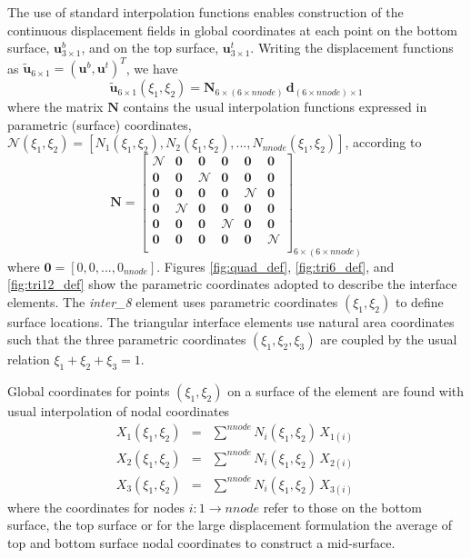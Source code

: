 \documentclass[11pt]{report}
\numberwithin{equation}{section}
\newcommand{\bmf } {\boldsymbol }  %
\newcommand{\ti}{\emph}
\begin{document}
The use of standard interpolation functions 
enables construction of the continuous displacement 
fields in global coordinates at each point on the bottom surface,
$\bmf{u}^b_{3 \times 1}$, and on the top surface, $\bmf{u}^t_{3 \times 1}$.
%
Writing the displacement functions as 
$\bmf{\tilde u}_{6 \times 1}=\left ( \bmf{u}^b,\bmf{u}^t \right )^T$, we have 
%
\begin{equation}
\bmf{\tilde u}_{6 \times 1} ( \xi_1, \xi_2)= \bmf{N}_{6 \times \left ( 6 \times nnode \right )}
\,\bmf{d}_{\left ( 6 \times nnode \right ) \times 1 }
\end{equation}
%
\noindent where the matrix $\bmf{N}$ contains the usual interpolation 
functions expressed in parametric (surface) coordinates, 
$\bmf{\mathcal{N}}\left( \xi_1, \xi_2 \right ) =
 \left[ N_1\left( \xi_1, \xi_2 \right ), N_2\left( \xi_1, \xi_2 \right ), ...,
 N_{nnode}\left( \xi_1, \xi_2 \right )\right ]$, according to
%
\begin{equation}
\bmf{N}= \left [
\begin{matrix}
\bmf{\mathcal{N}} & \bmf{0} & \bmf{0} & \bmf{0} & \bmf{0} & \bmf{0} \\ 
\bmf{0} & \bmf{0} & \bmf{\mathcal{N}}  & \bmf{0} & \bmf{0} & \bmf{0} \\ 
\bmf{0} & \bmf{0} & \bmf{0} & \bmf{0} &\bmf{\mathcal{N}}  & \bmf{0} \\ 
\bmf{0} & \bmf{\mathcal{N}} & \bmf{0} & \bmf{0}& \bmf{0}& \bmf{0} \\ 
\bmf{0} & \bmf{0} & \bmf{0} & \bmf{\mathcal{N}} &\bmf{0} & \bmf{0} \\ 
\bmf{0} & \bmf{0} & \bmf{0} & \bmf{0} & \bmf{0} & \bmf{\mathcal{N}} \\ 
\end{matrix} \right ]_{6 \times ( 6 \times nnode) }
\end{equation}
where $\bmf{0} = \left [ 0, 0, ..., 0_{nnode} \right ]$.
%
\noindent Figures  \ref{fig:quad_def},  \ref{fig:tri6_def}, and  \ref{fig:tri12_def} 
show the parametric coordinates adopted to describe the interface elements. 
The \ti{inter\_8}
element uses parametric coordinates $(\xi_1, \xi_2)$ to define surface locations. 
The triangular interface
elements use natural area coordinates such that the three parametric coordinates 
$(\xi_1, \xi_2, \xi_3)$ are coupled by the usual relation $\xi_1 + \xi_2 + \xi_3 = 1$.

Global coordinates for points $(\xi_1, \xi_2)$ on a surface of  the element are found with 
usual interpolation of nodal coordinates
\begin{eqnarray}
X_1(\xi_1, \xi_2) &=& \sum^{nnode} N_i(\xi_1, \xi_2)\, X_{1(i)} \\
X_2(\xi_1, \xi_2) &=& \sum^{nnode} N_i(\xi_1, \xi_2) \,X_{2(i)}\\
X_3(\xi_1, \xi_2) &=& \sum^{nnode} N_i(\xi_1, \xi_2)\, X_{3(i)}\ 
\end{eqnarray}
where the  coordinates for nodes $i:1\rightarrow nnode$ refer to those on the bottom surface,
the top surface or for the large displacement formulation the average of
top and bottom surface nodal coordinates to construct a mid-surface.
\end{document}
